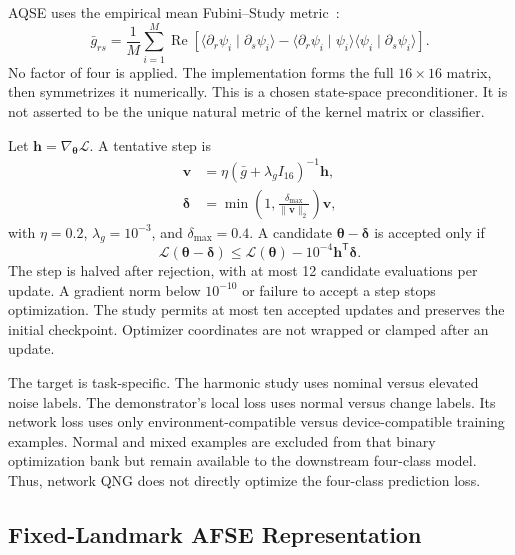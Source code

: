 AQSE uses the empirical mean Fubini--Study metric~\cite{stokes2020qng}:
\begin{equation}
 \bar g_{rs}=\frac{1}{M}\sum_{i=1}^{M}\operatorname{Re}\!\left[
 \langle\partial_r\psi_i\mid\partial_s\psi_i\rangle
 -\langle\partial_r\psi_i\mid\psi_i\rangle
  \langle\psi_i\mid\partial_s\psi_i\rangle\right].
 \label{eq:mean-fs}
\end{equation}
No factor of four is applied. The implementation forms the full $16\times16$ matrix, then symmetrizes it numerically. This is a chosen state-space preconditioner. It is not asserted to be the unique natural metric of the kernel matrix or classifier.

Let $\mathbf h=\nabla_{\boldsymbol\theta}\mathcal L$. A tentative step is
\begin{align}
 \mathbf v&=\eta(\bar g+\lambda_g I_{16})^{-1}\mathbf h,\nonumber\\
 \boldsymbol\delta&=\min\!\left(1,\frac{\delta_{\max}}{\|\mathbf v\|_2}\right)
                 \mathbf v,
 \label{eq:damped-qng}
\end{align}
with $\eta=0.2$, $\lambda_g=10^{-3}$, and $\delta_{\max}=0.4$. A candidate $\boldsymbol\theta-\boldsymbol\delta$ is accepted only if
\begin{equation}
 \mathcal L(\boldsymbol\theta-\boldsymbol\delta)
 \leq\mathcal L(\boldsymbol\theta)-10^{-4}
                       \mathbf h^{\mathsf T}\boldsymbol\delta.
 \label{eq:armijo-qng}
\end{equation}
The step is halved after rejection, with at most 12 candidate evaluations per update. A gradient norm below $10^{-10}$ or failure to accept a step stops optimization. The study permits at most ten accepted updates and preserves the initial checkpoint. Optimizer coordinates are not wrapped or clamped after an update.

The target is task-specific. The harmonic study uses nominal versus elevated noise labels. The demonstrator's local loss uses normal versus change labels. Its network loss uses only environment-compatible versus device-compatible training examples. Normal and mixed examples are excluded from that binary optimization bank but remain available to the downstream four-class model. Thus, network QNG does not directly optimize the four-class prediction loss.

\subsection{Fixed-Landmark AFSE Representation}
\label{sec:framework-afse}

